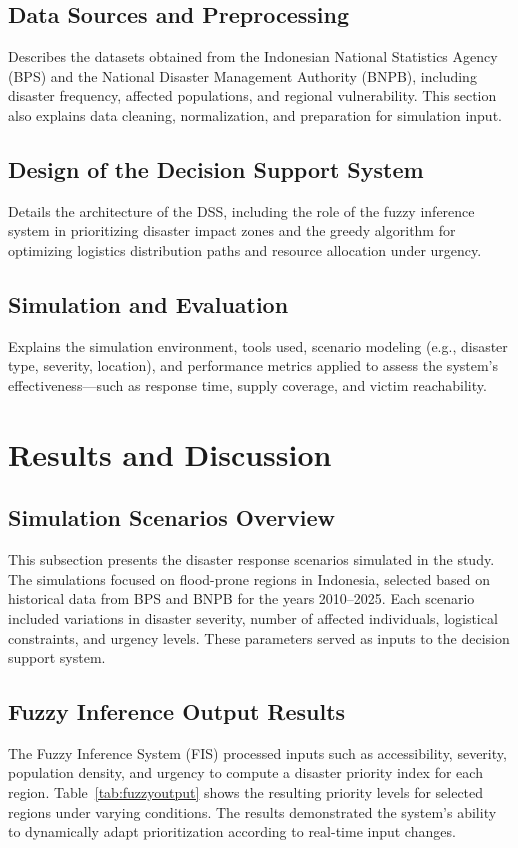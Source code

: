 \documentclass[journal,final,a4paper,twoside,11pt]{IEEEtran}
\begin{document}
\subsection{Data Sources and Preprocessing}
Describes the datasets obtained from the Indonesian National Statistics Agency (BPS) and the National Disaster Management Authority (BNPB), including disaster frequency, affected populations, and regional vulnerability. This section also explains data cleaning, normalization, and preparation for simulation input.

\subsection{Design of the Decision Support System}
Details the architecture of the DSS, including the role of the fuzzy inference system in prioritizing disaster impact zones and the greedy algorithm for optimizing logistics distribution paths and resource allocation under urgency.

\subsection{Simulation and Evaluation}
Explains the simulation environment, tools used, scenario modeling (e.g., disaster type, severity, location), and performance metrics applied to assess the system’s effectiveness—such as response time, supply coverage, and victim reachability.



\section{Results and Discussion}

\subsection{Simulation Scenarios Overview}
This subsection presents the disaster response scenarios simulated in the study. The simulations focused on flood-prone regions in Indonesia, selected based on historical data from BPS and BNPB for the years 2010–2025. Each scenario included variations in disaster severity, number of affected individuals, logistical constraints, and urgency levels. These parameters served as inputs to the decision support system.

\subsection{Fuzzy Inference Output Results}
The Fuzzy Inference System (FIS) processed inputs such as accessibility, severity, population density, and urgency to compute a disaster priority index for each region. Table~\ref{tab:fuzzyoutput} shows the resulting priority levels for selected regions under varying conditions. The results demonstrated the system’s ability to dynamically adapt prioritization according to real-time input changes.
\end{document}
